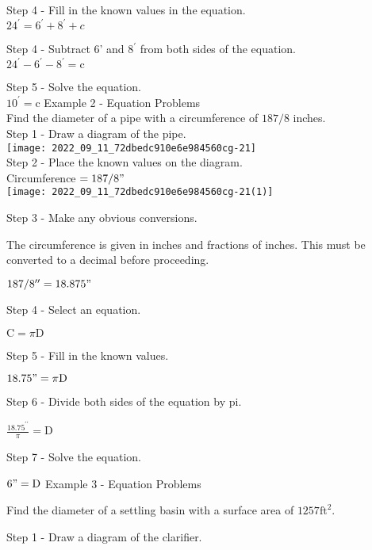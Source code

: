 Step 4 - Fill in the known values in the equation.\\

$24^{\prime}=6^{\prime}+8^{\prime}+c$

Step 4 - Subtract 6' and $8^{\prime}$ from both sides of the equation.\\

$24^{\prime}-6^{\prime}-8^{\prime}=\mathrm{c}$

Step 5 - Solve the equation.\\

$10^{\prime}=\mathrm{c}$ Example 2 - Equation Problems\\

Find the diameter of a pipe with a circumference of $187 / 8$ inches.\\

Step 1 - Draw a diagram of the pipe.\\

\texttt{[image: 2022\_09\_11\_72dbedc910e6e984560cg-21]}\\

Step 2 - Place the known values on the diagram.\\

Circumference $=187 / 8 "$\\

\texttt{[image: 2022\_09\_11\_72dbedc910e6e984560cg-21(1)]}

Step 3 - Make any obvious conversions.

The circumference is given in inches and fractions of inches. This must be converted to a decimal before proceeding.

$187 / 8^{\prime \prime}=18.875 "$

Step 4 - Select an equation.

$\mathrm{C}=\pi \mathrm{D}$

Step 5 - Fill in the known values.

$18.75 "=\pi \mathrm{D}$

Step 6 - Divide both sides of the equation by pi.

$\frac{18.75^{\prime \prime}}{\pi}=\mathrm{D}$

Step 7 - Solve the equation.

$6 "=\mathrm{D}$ Example 3 - Equation Problems

Find the diameter of a settling basin with a surface area of $1257 \mathrm{ft}^{2}$.

Step 1 - Draw a diagram of the clarifier.


